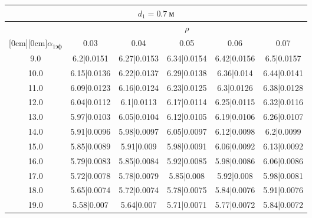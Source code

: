 \documentclass[20pt]{article}
\begin{document}
\begin{center}
\begin{tabular}{c|ccccc}
\hline
	\multicolumn{6}{c}{$d_{1}=0.7 \ м$} \\
\hline
	 & \multicolumn{5}{|c}{$\rho$} \\
	\cline{2-6}
	\raisebox{1.5ex}[0cm][0cm]{$\alpha_{1эф}$} & 0.03 & 0.04 & 0.05 & 0.06 & 0.07\\
\hline
	9.0 & 	6.2|0.0151 & 	6.27|0.0153 & 	6.34|0.0154 & 	6.42|0.0156 & 	6.5|0.0157\\
	10.0 & 	6.15|0.0136 & 	6.22|0.0137 & 	6.29|0.0138 & 	6.36|0.014 & 	6.44|0.0141\\
	11.0 & 	6.09|0.0123 & 	6.16|0.0124 & 	6.23|0.0125 & 	6.3|0.0126 & 	6.38|0.0128\\
	12.0 & 	6.04|0.0112 & 	6.1|0.0113 & 	6.17|0.0114 & 	6.25|0.0115 & 	6.32|0.0116\\
	13.0 & 	5.97|0.0103 & 	6.05|0.0104 & 	6.12|0.0105 & 	6.19|0.0106 & 	6.26|0.0107\\
	14.0 & 	5.91|0.0096 & 	5.98|0.0097 & 	6.05|0.0097 & 	6.12|0.0098 & 	6.2|0.0099\\
	15.0 & 	5.85|0.0089 & 	5.91|0.009 & 	5.98|0.0091 & 	6.06|0.0092 & 	6.13|0.0092\\
	16.0 & 	5.79|0.0083 & 	5.85|0.0084 & 	5.92|0.0085 & 	5.98|0.0086 & 	6.06|0.0086\\
	17.0 & 	5.72|0.0078 & 	5.78|0.0079 & 	5.85|0.008 & 	5.92|0.008 & 	5.98|0.0081\\
	18.0 & 	5.65|0.0074 & 	5.72|0.0074 & 	5.78|0.0075 & 	5.84|0.0076 & 	5.91|0.0076\\
	19.0 & 	5.58|0.007 & 	5.64|0.007 & 	5.71|0.0071 & 	5.77|0.0072 & 	5.84|0.0072\\
\end{tabular}


\end{center}
\end{document}

